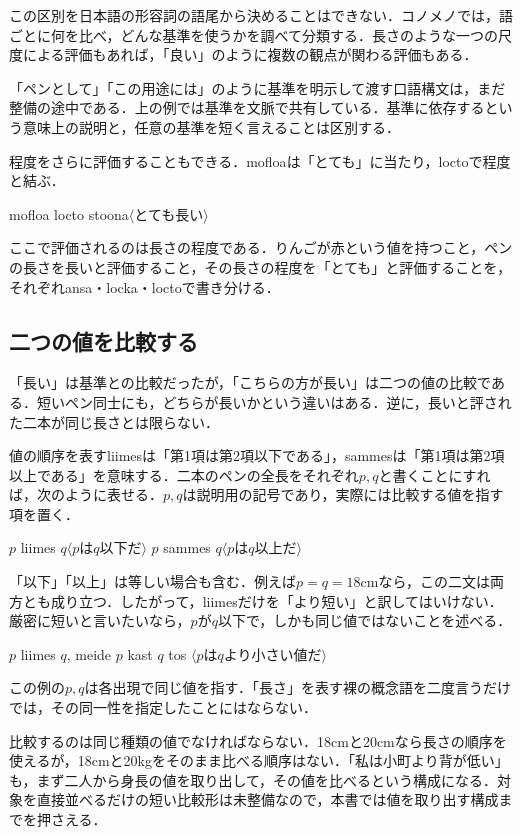 \documentclass[b5paper, 10pt]{ltjsarticle}
\newcommand{\ko}[1]{\textsf{#1}}
\newcommand{\sentence}[1]{$\langle$#1$\rangle$}
\begin{document}
この区別を日本語の形容詞の語尾から決めることはできない．コノメノでは，語ごとに何を比べ，どんな基準を使うかを調べて分類する．長さのような一つの尺度による評価もあれば，「良い」のように複数の観点が関わる評価もある．

\begin{remark}
    「ペンとして」「この用途には」のように基準を明示して渡す口語構文は，まだ整備の途中である．上の例では基準を文脈で共有している．基準に依存するという意味上の説明と，任意の基準を短く言えることは区別する．
\end{remark}

程度をさらに評価することもできる．\ko{mofloa}は「とても」に当たり，\ko{locto}で程度と結ぶ．
\begin{exe}
    \ex \ko{mofloa locto stoona}\hfill \sentence{とても長い}
\end{exe}
ここで評価されるのは長さの程度である．りんごが赤という値を持つこと，ペンの長さを長いと評価すること，その長さの程度を「とても」と評価することを，それぞれ\ko{ansa}・\ko{locka}・\ko{locto}で書き分ける．

\subsection{二つの値を比較する}
「長い」は基準との比較だったが，「こちらの方が長い」は二つの値の比較である．短いペン同士にも，どちらが長いかという違いはある．逆に，長いと評された二本が同じ長さとは限らない．

値の順序を表す\ko{liimes}は「第1項は第2項以下である」，\ko{sammes}は「第1項は第2項以上である」を意味する．二本のペンの全長をそれぞれ$p,q$と書くことにすれば，次のように表せる．$p,q$は説明用の記号であり，実際には比較する値を指す項を置く．
\begin{exe}
    \ex \ko{$p$ liimes $q$}\hfill \sentence{$p$は$q$以下だ}
    \ex \ko{$p$ sammes $q$}\hfill \sentence{$p$は$q$以上だ}
\end{exe}
「以下」「以上」は等しい場合も含む．例えば$p=q=18$cmなら，この二文は両方とも成り立つ．したがって，\ko{liimes}だけを「より短い」と訳してはいけない．厳密に短いと言いたいなら，$p$が$q$以下で，しかも同じ値ではないことを述べる．
\begin{exe}
    \ex \ko{$p$ liimes $q$, meide $p$ kast $q$ tos}
    \glt \sentence{$p$は$q$より小さい値だ}
\end{exe}
この例の$p,q$は各出現で同じ値を指す．「長さ」を表す裸の概念語を二度言うだけでは，その同一性を指定したことにはならない．

比較するのは同じ種類の値でなければならない．18cmと20cmなら長さの順序を使えるが，18cmと20kgをそのまま比べる順序はない．「私は小町より背が低い」も，まず二人から身長の値を取り出して，その値を比べるという構成になる．対象を直接並べるだけの短い比較形は未整備なので，本書では値を取り出す構成までを押さえる．
\end{document}

